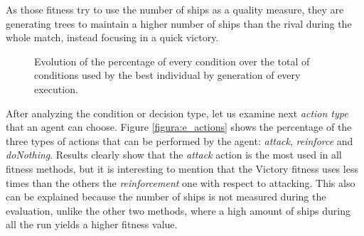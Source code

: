 \documentclass[preprint]{elsarticle}
\begin{document}
As those fitness try to use the number of ships as a quality measure,
they are generating trees to maintain a higher number of ships than
the rival during the whole match, instead focusing in a quick
victory. 

  \begin{figure}[ht]
  \begin{center}
  \end{center}
  \caption{Evolution of the percentage of every condition over the
    total of conditions used by the best individual by generation of
    every execution.} 
  \label{figura:e_conditions}
  \end{figure}

After analyzing the condition or decision type, let us examine next
{\em action type} that an agent can choose. Figure 
\ref{figura:e_actions} shows the percentage of the three types of
actions that can be performed by the agent: {\em attack}, {\em
  reinforce} and {\em doNothing}. Results clearly show that the {\em
  attack} action is the most used in all fitness methods, but it is
interesting to mention that the Victory fitness uses less times than
the others the {\em reinforcement} one with respect to attacking. 
 This
also can be explained because the number of ships is not measured
during the evaluation, unlike the other two methods, where a high
amount of ships during all the run yields a higher fitness value. 
\end{document}
